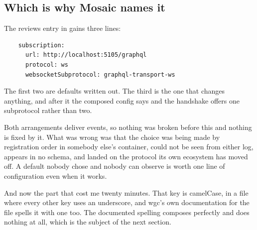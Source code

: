 \subsection*{Which is why Mosaic names it}

%
The reviews entry in  gains three lines:

\begin{verbatim}
    subscription:
      url: http://localhost:5105/graphql
      protocol: ws
      websocketSubprotocol: graphql-transport-ws
\end{verbatim}

The first two are defaults written out. The third is the one that changes
anything, and after it the composed config says
 and the handshake offers
one subprotocol rather than two.

Both arrangements deliver events, so nothing was broken before this and nothing
is fixed by it. What was wrong was that the choice was being made by
registration order in somebody else's container, could not be seen from either
log, appears in no schema, and landed on the protocol its own ecosystem has
moved off. A default nobody chose and nobody can observe is worth one line of
configuration even when it works.

%
And now the part that cost me twenty minutes. That key is camelCase, in a file
where every other key uses an underscore, and wgc's own documentation for the
file spells it with one too. The documented spelling composes perfectly and
does nothing at all, which is the subject of the next section.

%
